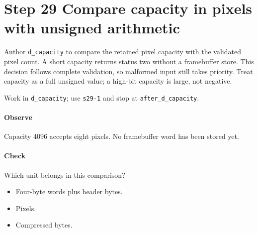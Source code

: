 \section{Step 29 Compare capacity in pixels with unsigned arithmetic}\label{qoi-s29}
Author \texttt{d\_capacity} to compare the retained pixel capacity with the validated pixel count. A short capacity returns status two without a framebuffer store. This decision follows complete validation, so malformed input still takes priority. Treat capacity as a full unsigned value; a high-bit capacity is large, not negative.

Work in \texttt{d\_capacity}; use \texttt{s29-1} and stop at \texttt{after\_d\_capacity}.

\paragraph{Observe} Capacity 4096 accepts eight pixels. No framebuffer word has been stored yet.

\paragraph{Check} Which unit belongs in this comparison?
\begin{itemize}
  \item[A.] Four-byte words plus header bytes.
  \item[B.] Pixels.
  \item[C.] Compressed bytes.
\end{itemize}
